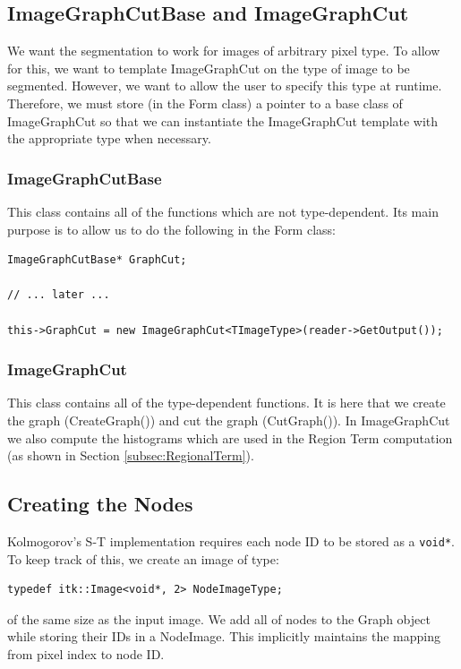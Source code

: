 \documentclass{InsightArticle}
\begin{document}
\subsection{ImageGraphCutBase and ImageGraphCut}
We want the segmentation to work for images of arbitrary pixel type. To allow for this, we want to template ImageGraphCut on the type of image to be segmented. However, we want to allow the user to specify this type at runtime. Therefore, we must store (in the Form class) a pointer to a base class of ImageGraphCut so that we can instantiate the ImageGraphCut template with the appropriate type when necessary.

\subsubsection{ImageGraphCutBase}
This class contains all of the functions which are not type-dependent. Its main purpose is to allow us to do the following in the Form class:
\begin{verbatim}
ImageGraphCutBase* GraphCut;

// ... later ...

this->GraphCut = new ImageGraphCut<TImageType>(reader->GetOutput());
\end{verbatim}

\subsubsection{ImageGraphCut}
This class contains all of the type-dependent functions. It is here that we create the graph (CreateGraph()) and cut the graph (CutGraph()). In ImageGraphCut we also compute the histograms which are used in the Region Term computation (as shown in Section \ref{subsec:RegionalTerm}).

\subsection{Creating the Nodes}
Kolmogorov's S-T implementation requires each node ID to be stored as a \verb|void*|. To keep track of this, we create an image of type:
\begin{verbatim}
typedef itk::Image<void*, 2> NodeImageType;
\end{verbatim}

of the same size as the input image. We add all of nodes to the Graph object while storing their IDs in a NodeImage. This implicitly maintains the mapping from pixel index to node ID.
\end{document}
